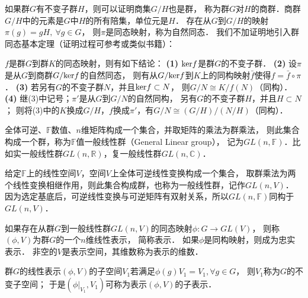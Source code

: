 如果群$G$有不变子群$H$，则可以证明\cite[\S 1.3]{mengdj-cxds-1}商集$G/H$也是群，
称为群$G$对$H$的{\heiti 商群}．商群$G/H$中的元素是$G$中$H$的所有陪集，单位元是$H$．
存在从$G$到$G/H$的映射$\boxed{\pi (g)= gH,\ \forall g\in G}$，
则$\pi$是同态映射，称为{\heiti 自然同态}．
我们不加证明地引入群同态基本定理（证明过程可参考\parencite[\S 1.7]{mengdj-cxds-1}或类似书籍）：

\begin{theorem}\label{chtop:thm_ghk}
    $f$是群$G$到群$K$的同态映射，则有如下结论：
    {\bfseries (1)} ${\rm ker}f$是群$G$的不变子群．
    {\bfseries (2)} 设$\pi$是从$G$到商群$G/{\rm ker}f$的自然同态，
    则有从$G/{\rm ker}f$到$K$上的同构映射$\bar{f}$使得$f=\bar{f}\circ \pi$．
    {\bfseries (3)} 若另有$G$的不变子群$N$，并且${\rm ker}f\subset N$，
    则$G/N \cong K/f(N)$（同构）．
    {\bfseries (4)}  继(3)中记号；$\pi'$是从$G$到$G/N$的自然同构，
    另有$G$的不变子群$H$，并且$H\subset N$；
    则将(3)中的$K$换成$G/H$，$f$换成$\pi'$，有$G/N \cong (G/H)/(N/H)$（同构）．
\end{theorem}

    
\begin{example}
    全体可逆、$\mathbb{F}$数值、$n$维矩阵构成一个集合，并取矩阵的乘法为群乘法，
    则此集合构成一个群，称为$\mathbb{F}$值{\heiti 一般线性群}（General Linear group），
    记为$GL(n,\mathbb{F})$．比如实一般线性群$GL(n,\mathbb{R})$，复一般线性群$GL(n,\mathbb{C})$．
\end{example}

\begin{example}
    给定$\mathbb{F}$上的线性空间$V$，空间$V$上全体可逆线性变换构成一个集合，
    取群乘法为两个线性变换相继作用，则此集合构成群，也称为{\heiti 一般线性群}，记作$GL(n,V)$．
    因为选定基底后，可逆线性变换与可逆矩阵有双射关系，所以$GL(n,\mathbb{F})$同构于$GL(n,V)$．
\end{example}


\begin{definition}\label{chtop:def_group_representation}
    如果存在从群$G$到一般线性群$GL(n,V)$的同态映射$\phi:G\to GL(V)$，
    则称$(\phi,V)$为群$G$的一个$n$维{\heiti 线性表示}，
    简称{\heiti 表示}． 如果$\phi$是同构映射，则成为{\heiti  忠实表示}．
    非空的$V$是表示空间，其维数称为表示的{\heiti 维数}．
\end{definition}
    
\begin{definition}
    群$G$的线性表示$(\phi,V)$的子空间$V_1$若满足$\phi(g)V_1 = V_1,\forall g\in G$，
    则$V_1$称为$G$的{\heiti 不变子空间}；
    于是$(\phi|_{V_1},V_1)$可称为表示$(\phi,V)$的{\heiti 子表示}．
\end{definition}

